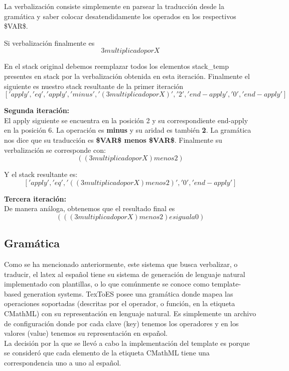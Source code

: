 La verbalización consiste simplemente en parsear la traducción desde la gramática y saber colocar desatendidamente los operados en los respectivos \$VAR\$.

Si verbalización finalmente es
$$3 multiplicado por X$$

En el stack original debemos reemplazar todos los elementos stack\_temp presentes en stack por la verbalización obtenida en esta iteración. Finalmente el siguiente es nuestro stack resultante de la primer iteración
$$['apply', 'eq', 'apply', 'minus', '(3 multiplicado por X)', '2', 'end-apply', '0', 'end-apply']$$

{\Large \textbf{Segunda iteración:\\}}
El apply siguiente se encuentra en la posición 2 y su correspondiente end-apply en la posición 6. La operación es \textbf{minus} y su aridad es también \textbf{2}. La gramática nos dice que su traducción es \textbf{\$VAR\$ menos \$VAR\$}. Finalmente su verbalización se corresponde con:
$$((3 multiplicado por X) menos 2)$$

Y el stack resultante es:
$$['apply', 'eq', '((3 multiplicado por X) menos 2)', '0', 'end-apply']$$

{\Large \textbf{Tercera iteración:\\}}
De manera análoga, obtenemos que el resultado final es
$$(((3 multiplicado por X) menos 2) es igual a 0)$$


\subsection{Gramática}

Como se ha mencionado anteriormente, este sistema que busca verbalizar, o traducir, el latex al español tiene su sistema
de generación de lenguaje natural implementado con plantillas, o lo que comúnmente se conoce como template-based generation systems.
TexToES posee una gramática donde mapea las operaciones soportadas (descritas por el operador, o función, en la etiqueta CMathML) con su representación en lenguaje natural. Es simplemente un archivo de configuración donde por cada clave (key) tenemos los operadores y en los valores (value) tenemos su representación en español.\\

La decisión por la que se llevó a cabo la implementación del template es porque se consideró que cada elemento de la etiqueta CMathML tiene una correspondencia uno a uno al español.\\

